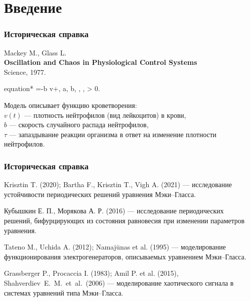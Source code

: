 \begin{frame}
    \setcounter{framenumber}{1}
    \maketitle
\end{frame}

\section{Введение}

\begin{frame}
	\frametitle{Историческая справка}
	
	Mackey M., Glass L.\\
	\textbf{Oscillation and Chaos in Physiological Control Systems}\\
	Science, 1977.
	
	\begin{empheq}[box=\myeq]{equation*}
		=-b v+, \quad a, b, \theta, \tau, \gamma > 0.
	\end{empheq}
	
	Модель описывает функцию кроветворения:\\
	$v(t)$ --- плотность нейтрофилов (вид лейкоцитов) в крови,\\
	$b$ --- скорость случайного распада нейтрофилов,\\
	$\tau$ --- запаздывание реакции организма в ответ на изменение плотности нейтрофилов.
\end{frame}

\begin{frame}
	\frametitle{Историческая справка}
	
	Krisztin T. (2020); Bartha F., Krisztin T., Vigh A. (2021) --- исследование устойчивости периодических решений уравнения Мэки--Гласса.
	
	\smallskip
	
	Кубышкин Е. П., Морякова А. Р. (2016) --- исследование периодических решений, бифурцирующих из состояния равновесия при изменении параметров уравнения.
	
	\smallskip
	
	Tateno M., Uchida A. (2012); Namajūnas et al. (1995) --- моделирование функционирования электрогенераторов, описываемых уравнением Мэки--Гласса.
	
	\smallskip
	
	Grassberger P., Procaccia I. (1983); Amil P. et al. (2015), Shahverdiev~E.~M.~et~al.~(2006) --- моделирование хаотического сигнала в системах уравнений типа Мэки--Гласса.	
\end{frame}

